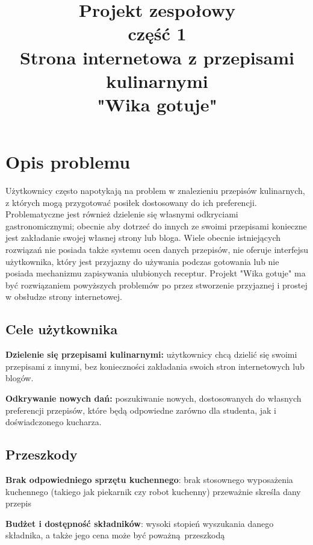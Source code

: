 \documentclass{article}
\title{\fontsize{20}{22}\selectfont Projekt zespołowy\\ część 1\\Strona internetowa z przepisami kulinarnymi\\"Wika gotuje"}
\date{}
\newenvironment{itemize.zip}
{ \begin{itemize}
    \setlength{\itemsep}{0pt}
    \setlength{\parskip}{0pt}
    \setlength{\parsep}{0pt}     }
{ \end{itemize}                  }
\begin{document}
\section{Opis problemu}
\noindent
Użytkownicy często napotykają na problem w znalezieniu przepisów kulinarnych, z których mogą przygotować posiłek dostosowany do ich preferencji. Problematyczne jest również dzielenie
się własnymi odkryciami gastronomicznymi; obecnie aby dotrzeć do innych ze swoimi przepisami konieczne jest zakładanie swojej własnej strony lub bloga. Wiele obecnie istniejących
rozwiązań nie posiada także systemu ocen danych przepisów, nie oferuje interfejsu użytkownika, który jest przyjazny do używania podczas gotowania lub nie posiada mechanizmu zapisywania
ulubionych receptur. Projekt "Wika gotuje" ma być rozwiązaniem powyższych problemów po przez stworzenie przyjaznej i prostej w obsłudze strony internetowej.

\subsection{Cele użytkownika}
\begin{itemize.zip}
    \item \textbf{Dzielenie się przepisami kulinarnymi:} użytkownicy chcą dzielić się swoimi przepisami z innymi, bez konieczności zakładania swoich stron internetowych lub blogów.
    \item \textbf{Odkrywanie nowych dań:} poszukiwanie nowych, dostosowanych do własnych preferencji przepisów, które będą odpowiedne zarówno dla studenta, jak i doświadczonego kucharza.
\end{itemize.zip}

\subsection{Przeszkody}
\begin{itemize.zip}
    \item \textbf{Brak odpowiedniego sprzętu kuchennego}: brak stosownego wyposażenia kuchennego (takiego jak piekarnik czy robot kuchenny) przeważnie skreśla dany przepis
    \item \textbf{Budżet i dostępność składników}: wysoki stopień wyszukania danego składnika, a także jego cena może być poważną przeszkodą
\end{itemize.zip}
\end{document}
